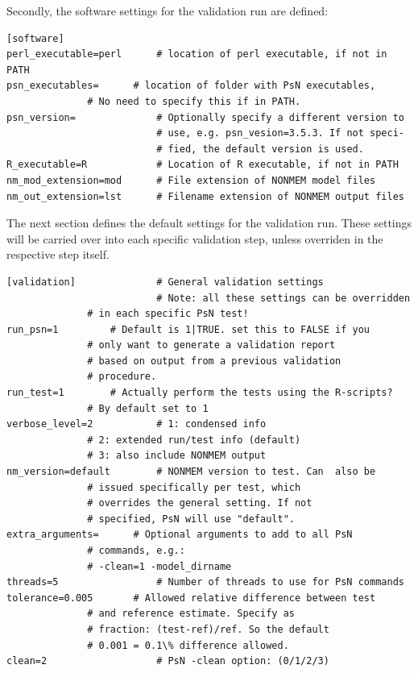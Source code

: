 \documentclass[a4,11pt]{report} \usepackage[pdftex]{graphicx}
\begin{document}
\vspace{5pt}

\noindent Secondly, the software settings for the validation run are defined:

\begin{lstlisting}
[software]
perl_executable=perl      # location of perl executable, if not in PATH
psn_executables=	  # location of folder with PsN executables,
			  # No need to specify this if in PATH.
psn_version=              # Optionally specify a different version to
                          # use, e.g. psn_vesion=3.5.3. If not speci-
                          # fied, the default version is used.
R_executable=R            # Location of R executable, if not in PATH
nm_mod_extension=mod      # File extension of NONMEM model files
nm_out_extension=lst      # Filename extension of NONMEM output files
\end{lstlisting}

\vspace{5pt}

\noindent The next section defines the default settings for the
validation run. These settings will be carried over into each specific
validation step, unless overriden in the respective step itself.

\begin{lstlisting}
[validation]              # General validation settings
                          # Note: all these settings can be overridden
			  # in each specific PsN test!
run_psn=1		  # Default is 1|TRUE. set this to FALSE if you
			  # only want to generate a validation report
			  # based on output from a previous validation
			  # procedure.
run_test=1		  # Actually perform the tests using the R-scripts?
			  # By default set to 1
verbose_level=2           # 1: condensed info
			  # 2: extended run/test info (default)
			  # 3: also include NONMEM output
nm_version=default        # NONMEM version to test. Can  also be
			  # issued specifically per test, which
			  # overrides the general setting. If not
			  # specified, PsN will use "default".
extra_arguments=	  # Optional arguments to add to all PsN
			  # commands, e.g.:
			  # -clean=1 -model_dirname
threads=5                 # Number of threads to use for PsN commands
tolerance=0.005  	  # Allowed relative difference between test
		 	  # and reference estimate. Specify as
		 	  # fraction: (test-ref)/ref. So the default
		 	  # 0.001 = 0.1\% difference allowed.
clean=2                   # PsN -clean option: (0/1/2/3)
\end{lstlisting}
\end{document}

